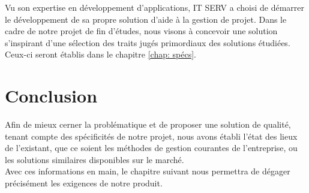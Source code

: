 \begin{spacing}{1.5}
Vu son expertise en développement d'applications, IT SERV a choisi de démarrer le développement de sa propre solution d'aide à la gestion de projet. Dans le cadre de notre projet de fin d'études, nous visons à concevoir une solution s'inspirant d'une sélection des traits jugés primordiaux des solutions étudiées. Ceux-ci seront établis dans le chapitre \ref{chap: spécs}.

\section*{Conclusion}
Afin de mieux cerner la problématique et de proposer une solution de qualité, tenant compte des spécificités de notre projet, nous avons établi l'état des lieux de l'existant, que ce soient les méthodes de gestion courantes de l'entreprise, ou les solutions similaires disponibles sur le marché.\\
Avec ces informations en main, le chapitre suivant nous permettra de dégager précisément les exigences de notre produit.


\end{spacing}
